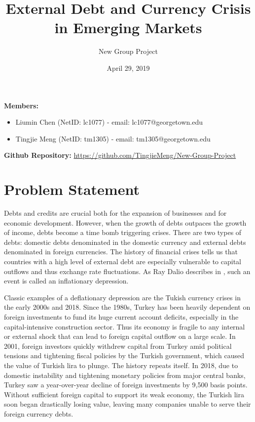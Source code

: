 \documentclass[12pt,]{article}
\title{External Debt and Currency Crisis in Emerging Markets}
\author{New Group Project}
\date{April 29, 2019}
\begin{document}
\maketitle

\textbf{Members:}

\begin{itemize}
  \itemsep-.6em
  \item Liumin Chen (NetID: lc1077) - email: lc1077@georgetown.edu\
  \item Tingjie  Meng (NetID: tm1305) - email: tm1305@georgetown.edu\
\end{itemize}

\textbf{Github Repository:}
\url{https://github.com/TingjieMeng/New-Group-Project}

\section{Problem Statement}\label{problem-statement}

Debts and credits are crucial both for the expansion of businesses and
for economic development. However, when the growth of debts outpaces the
growth of income, debts become a time bomb triggering crises. There are
two types of debts: domestic debts denominated in the domestic currency
and external debts denominated in foreign currencies. The history of
financial crises tells us that countries with a high level of external
debt are especially vulnerable to capital outflows and thus exchange
rate fluctuations. As Ray Dalio describes in , such an event is called
an inflationary depression.

Classic examples of a deflationary depression are the Tukish currency
crises in the early 2000s and 2018. Since the 1980s, Turkey has been
heavily dependent on foreign investments to fund its huge current
account deficits, especially in the capital-intensive construction
sector. Thus its economy is fragile to any internal or external shock
that can lead to foreign capital outflow on a large scale. In 2001,
foreign investors quickly withdrew capital from Turkey amid political
tensions and tightening fiscal policies by the Turkish government, which
caused the value of Turkish lira to plunge. The history repeats itself.
In 2018, due to domestic instability and tightening monetary policies
from major central banks, Turkey saw a year-over-year decline of foreign
investments by 9,500 basis points. Without sufficient foreign capital to
support its weak economy, the Turkish lira soon began drastically losing
value, leaving many companies unable to serve their foreign currency
debts.
\end{document}

